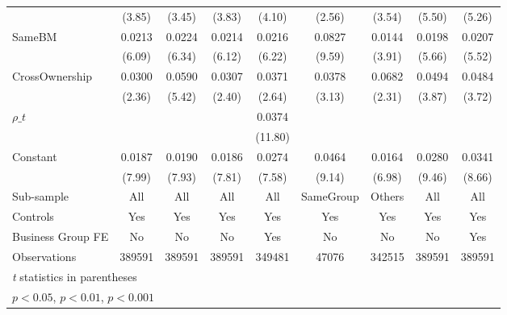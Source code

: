 {\begin{tabular}{l*{8}{c}}
                &   (3.85)         &   (3.45)         &   (3.83)         &   (4.10)         &   (2.56)         &   (3.54)         &   (5.50)         &   (5.26)         \\
[1em]
SameBM          &   0.0213\sym{***}&   0.0224\sym{***}&   0.0214\sym{***}&   0.0216\sym{***}&   0.0827\sym{***}&   0.0144\sym{***}&   0.0198\sym{***}&   0.0207\sym{***}\\
                &   (6.09)         &   (6.34)         &   (6.12)         &   (6.22)         &   (9.59)         &   (3.91)         &   (5.66)         &   (5.52)         \\
[1em]
CrossOwnership  &   0.0300\sym{*}  &   0.0590\sym{***}&   0.0307\sym{*}  &   0.0371\sym{*}  &   0.0378\sym{**} &   0.0682\sym{*}  &   0.0494\sym{***}&   0.0484\sym{***}\\
                &   (2.36)         &   (5.42)         &   (2.40)         &   (2.64)         &   (3.13)         &   (2.31)         &   (3.87)         &   (3.72)         \\
[1em]
 $ {\rho\_t} $   &                  &                  &                  &   0.0374\sym{***}&                  &                  &                  &                  \\
                &                  &                  &                  &  (11.80)         &                  &                  &                  &                  \\
[1em]
Constant        &   0.0187\sym{***}&   0.0190\sym{***}&   0.0186\sym{***}&   0.0274\sym{***}&   0.0464\sym{***}&   0.0164\sym{***}&   0.0280\sym{***}&   0.0341\sym{***}\\
                &   (7.99)         &   (7.93)         &   (7.81)         &   (7.58)         &   (9.14)         &   (6.98)         &   (9.46)         &   (8.66)         \\
\hline
Sub-sample      &      All         &      All         &      All         &      All         &SameGroup         &   Others         &      All         &      All         \\
Controls        &      Yes         &      Yes         &      Yes         &      Yes         &      Yes         &      Yes         &      Yes         &      Yes         \\
Business Group FE&       No         &       No         &       No         &      Yes         &       No         &       No         &       No         &      Yes         \\
Observations    &   389591         &   389591         &   389591         &   349481         &    47076         &   342515         &   389591         &   389591         \\
\hline\hline
\multicolumn{9}{l}{\footnotesize \textit{t} statistics in parentheses}\\
\multicolumn{9}{l}{\footnotesize \sym{*} \(p<0.05\), \sym{**} \(p<0.01\), \sym{***} \(p<0.001\)}\\
\end{tabular}
}
